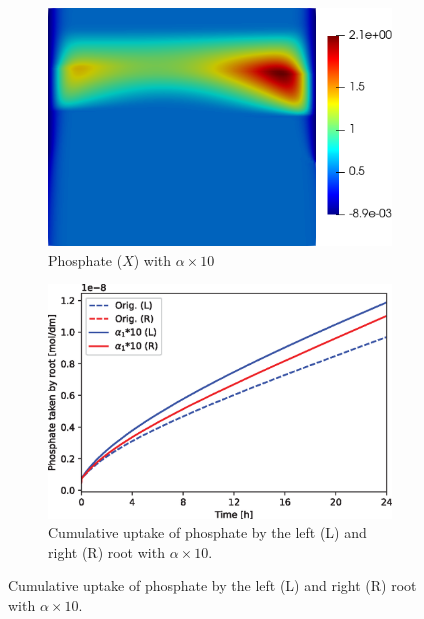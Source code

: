 \documentclass[11pt]{article}
\numberwithin{equation}{section}
\begin{document}
\begin{figure}[!htb]
\centering
\begin{subfigure}[t]{0.35\textwidth}
    \includegraphics[width=\textwidth]{Figures/X_alpha1times10.png}
    \caption{Phosphate ($X$) with $\alpha \times 10$}
    \label{fig:numexp_a1_up1}
\end{subfigure}
\hspace{1cm}
\begin{subfigure}[t]{0.4\textwidth}
    \includegraphics[width=\textwidth]{Figures/alpha1times10.eps}
    \caption{Cumulative uptake of phosphate by the left (L) and right (R) root with $\alpha \times 10$.}
    \label{fig:numexp_a1_up2}
\end{subfigure}


\end{figure}
\end{document}
